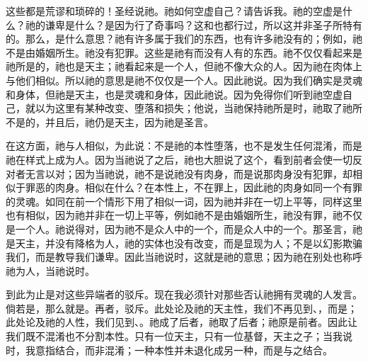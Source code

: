 这些都是荒谬和琐碎的！圣经说祂。祂如何空虚自己？请告诉我。祂的空虚是什么？祂的谦卑是什么？是因为行了奇事吗？这和也都行过，所以这并非圣子所特有的。那么，是什么意思？祂有许多属于我们的东西，也有许多祂没有的；例如，祂不是由婚姻所生。祂没有犯罪。这些是祂有而没有人有的东西。祂不仅仅看起来是祂所是的，祂也是天主；祂看起来是一个人，但祂不像大众的人。因为祂在肉体上与他们相似。所以祂的意思是祂不仅仅是一个人。因此祂说。因为我们确实是灵魂和身体，但祂是天主，也是灵魂和身体，因此祂说。因为免得你们听到祂空虚自己，就以为这里有某种改变、堕落和损失；他说，当祂保持祂所是时，祂取了祂所不是的，并且后，祂仍是天主，因为祂是圣言。\par

在这方面，祂与人相似，为此说：不是祂的本性堕落，也不是发生任何混淆，而是祂在样式上成为人。因为当祂说了之后，祂也大胆说了这个，看到前者会使一切反对者无言以对；因为当祂说，祂不是说祂没有肉身，而是说那肉身没有犯罪，却相似于罪恶的肉身。相似在什么？在本性上，不在罪上，因此祂的肉身如同一个有罪的灵魂。如同在前一个情形下用了相似一词，因为祂并非在一切上平等，同样这里也有相似，因为祂并非在一切上平等，例如祂不是由婚姻所生，祂没有罪，祂不仅是一个人。祂说得对，因为祂不是众人中的一个，而是众人中的一个。那圣言，祂是天主，并没有降格为人，祂的实体也没有改变，而是显现为人；不是以幻影欺骗我们，而是教导我们谦卑。因此当祂说时，这就是祂的意思；因为祂在别处也称呼祂为人，当祂说时。\par

到此为止是对这些异端者的驳斥。现在我必须针对那些否认祂拥有灵魂的人发言。倘若是，那么就是。再者，驳斥。此处论及祂的天主性，我们不再见到、，而是；此处论及祂的人性，我们见到、。祂成了后者，祂取了后者；祂原是前者。因此让我们既不混淆也不分割本性。只有一位天主，只有一位基督，天主之子；当我说时，我意指结合，而非混淆；一种本性并未退化成另一种，而是与之结合。\par

